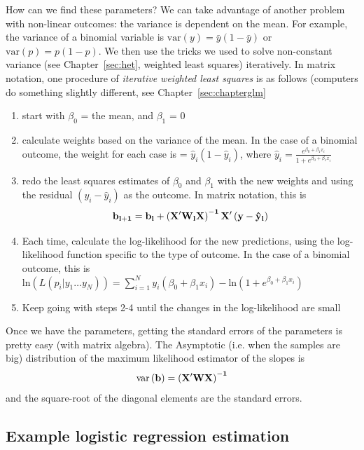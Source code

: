 How can we find these parameters? We can take advantage of another problem with non-linear outcomes: the variance is dependent on the mean. For example, the variance of a binomial variable is $\mbox{var}\left(y\right)=\bar{y}\left(1-\bar{y}\right)$ or $\mbox{var}\left(p\right)=p\left(1-p\right)$. We then use the tricks we used to solve non-constant variance (see Chapter~\ref{sec:het}, weighted least squares) iteratively. In matrix notation, one procedure of {\it iterative weighted least squares} is as follows (computers do something slightly different, see Chapter~\ref{sec:chapterglm}
\begin{enumerate}
\item{start with $\beta_0$ = the mean, and $\beta_1$ = 0}
\item{calculate weights based on the variance of the mean. In the case of a binomial outcome, the weight for each case is = $\hat{y}_i\left(1-\hat{y}_i\right)$}, where $\hat{y}_i=\frac{e^{\beta_0+\beta_1x_i}}{1+e^{\beta_0+\beta_1x_i}}$
\item{redo the least squares estimates of $\beta_0$ and $\beta_1$ with the new weights and using the residual $(y_i-\hat{y}_i)$ as the outcome. In matrix notation, this is}
\begin{equation}
{\bf{b}_{l+1}} ={\bf{b}_{l}} + {\bf{\left(X'W_lX\right)^{-1}X'\left(y-\hat{y}_l\right)}}
\end{equation}
\item{Each time, calculate the log-likelihood for the new predictions, using the log-likelihood function specific to the type of outcome. In the case of a binomial outcome, this is $\mbox{ln}\left(L\left(p_i \vert y_1 \ldots y_N\right)\right)=\sum_{i=1}^N y_i\left(\beta_0+\beta_1x_i\right)-\mbox{ln}\left(1+e^{\beta_0+\beta_1x_i}\right)$}
\item{Keep going with steps 2-4 until the changes in the log-likelihood are small}
\end{enumerate}

Once we have the parameters, getting the standard errors of the parameters is pretty easy (with matrix algebra). The Asymptotic (i.e. when the samples are big) distribution of the maximum likelihood estimator of the slopes is
\begin{equation}\label{eq:glmmatrixvar}
\mbox{var}\left({\bf b}\right) = {\bf{\left(X'WX\right)^{-1}}}
\end{equation}
and the square-root of the diagonal elements are the standard errors.

\subsection{Example logistic regression estimation}

